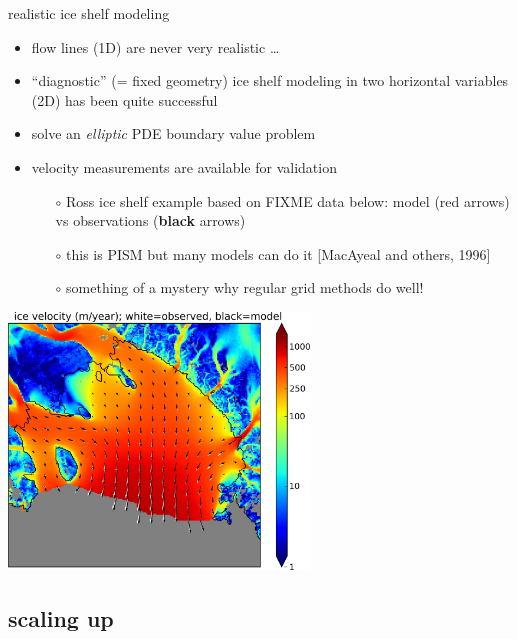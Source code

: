 \begin{frame}{realistic ice shelf modeling}

\small
\begin{itemize}
\item flow lines (1D) are never very realistic \dots
\item ``diagnostic'' (= fixed geometry) ice shelf modeling in two horizontal variables (2D) has been quite successful
\item solve an \emph{elliptic} PDE boundary value problem
\item velocity measurements are available for validation
  \begin{itemize}
  \scriptsize
  \item[$\circ$] Ross ice shelf example based on FIXME data below: model (\alert{red} arrows) vs observations (\textbf{black} arrows)
  \item[$\circ$] this is PISM but many models can do it [MacAyeal and others, 1996]
  \item[$\circ$] something of a mystery why regular grid methods do well!
  \small
  \end{itemize}
\end{itemize}

\begin{center}
  \includegraphics[width=0.6\textwidth]{photos/rossquiver}
\end{center}
\end{frame}


\subsection{scaling up}


